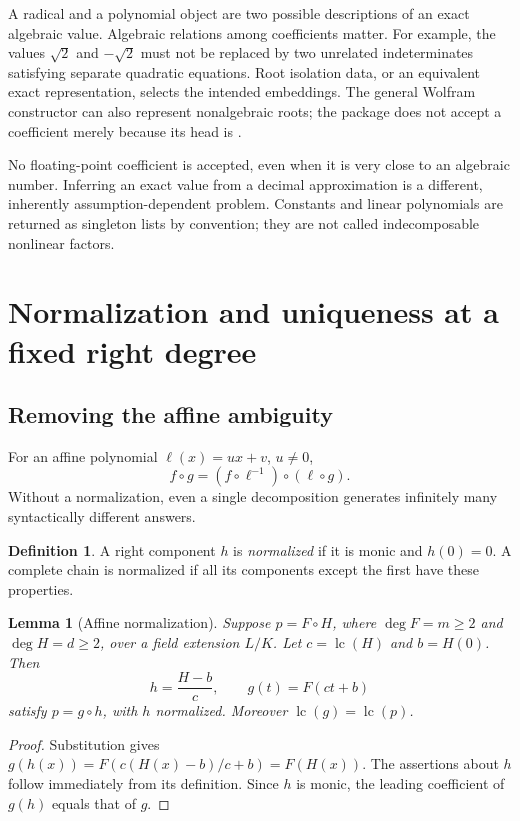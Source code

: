 \documentclass[11pt,a4paper]{article}
\newtheorem{lemma}[theorem]{Lemma}
\theoremstyle{definition}
\newtheorem{definition}[theorem]{Definition}
\newcommand{\lc}{\operatorname{lc}}
\newcommand{\code}[1]{\texttt{\detokenize{#1}}}
\begin{document}
A radical and a polynomial \code{Root} object are two possible descriptions of an exact algebraic value. Algebraic relations among coefficients matter. For example, the values $\sqrt2$ and $-\sqrt2$ must not be replaced by two unrelated indeterminates satisfying separate quadratic equations. Root isolation data, or an equivalent exact representation, selects the intended embeddings. The general Wolfram \code{Root} constructor can also represent nonalgebraic roots; the package does not accept a coefficient merely because its head is \code{Root} \cite{root}.

No floating-point coefficient is accepted, even when it is very close to an algebraic number. Inferring an exact value from a decimal approximation is a different, inherently assumption-dependent problem. Constants and linear polynomials are returned as singleton lists by convention; they are not called indecomposable nonlinear factors.

\section{Normalization and uniqueness at a fixed right degree}
\subsection{Removing the affine ambiguity}
For an affine polynomial $\ell(x)=ux+v$, $u\ne0$,
\[
 f\circ g=(f\circ\ell^{-1})\circ(\ell\circ g).
\]
Without a normalization, even a single decomposition generates infinitely many syntactically different answers.

\begin{definition}
A right component $h$ is \emph{normalized} if it is monic and $h(0)=0$. A complete chain is normalized if all its components except the first have these properties.
\end{definition}

\begin{lemma}[Affine normalization]\label{lem:normalization}
Suppose $p=F\circ H$, where $\deg F=m\ge2$ and $\deg H=d\ge2$, over a field extension $L/K$. Let $c=\lc(H)$ and $b=H(0)$. Then
\[
 h=\frac{H-b}{c},\qquad g(t)=F(ct+b)
\]
satisfy $p=g\circ h$, with $h$ normalized. Moreover $\lc(g)=\lc(p)$.
\end{lemma}
\begin{proof}
Substitution gives $g(h(x))=F(c(H(x)-b)/c+b)=F(H(x))$. The assertions about $h$ follow immediately from its definition. Since $h$ is monic, the leading coefficient of $g(h)$ equals that of $g$.
\end{proof}
\end{document}
